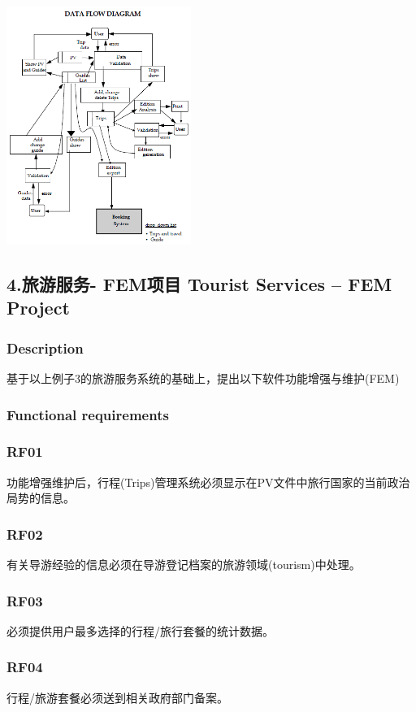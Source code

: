 \includegraphics[width=6cm]{Sifp_3_2.png}

\hypertarget{ux65c5ux6e38ux670dux52a1--femux9879ux76ee-tourist-services-fem-project}{%
\subsection{4.旅游服务- FEM项目 Tourist Services -- FEM
Project}\label{ux65c5ux6e38ux670dux52a1--femux9879ux76ee-tourist-services-fem-project}}

\hypertarget{description-1}{%
\subsubsection{Description}\label{description-1}}

基于以上例子3的旅游服务系统的基础上，提出以下软件功能增强与维护(FEM)\\

\hypertarget{functional-requirements-1}{%
\subsubsection{Functional
requirements}\label{functional-requirements-1}}

\hypertarget{rf01-1}{%
\subsubsection{RF01}\label{rf01-1}}

功能增强维护后，行程(Trips)管理系统必须显示在PV文件中旅行国家的当前政治局势的信息。\\

\hypertarget{rf02-1}{%
\subsubsection{RF02}\label{rf02-1}}

有关导游经验的信息必须在导游登记档案的旅游领域(tourism)中处理。\\


\hypertarget{rf03-1}{%
\subsubsection{RF03}\label{rf03-1}}

必须提供用户最多选择的行程/旅行套餐的统计数据。\\

\hypertarget{rf04-1}{%
\subsubsection{RF04}\label{rf04-1}}

行程/旅游套餐必须送到相关政府部门备案。\\


